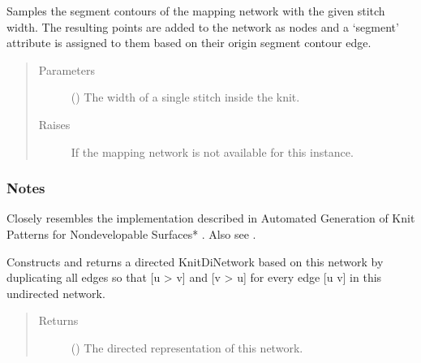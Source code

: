 \documentclass[letterpaper,10pt,english]{sphinxmanual}
\begin{document}
\begin{fulllineitems}
\begin{fulllineitems}
\label{\detokenize{cockatoo:cockatoo.KnitNetwork.sample_segment_contours}}
Samples the segment contours of the mapping network with the given
stitch width. The resulting points are added to the network as nodes
and a ‘segment’ attribute is assigned to them based on their origin
segment contour edge.
\begin{quote}\begin{description}
\item[{Parameters}] \leavevmode
{} () \textendash{} The width of a single stitch inside the knit.

\item[{Raises}] \leavevmode
{\hyperref[\detokenize{cockatoo:cockatoo.exception.MappingNetworkError}]{}} \textendash{} If the mapping network is not available for this instance.

\end{description}\end{quote}
\subsubsection*{Notes}

Closely resembles the implementation described in Automated Generation
of Knit Patterns for Non\sphinxhyphen{}developable Surfaces* \sphinxfootnotemark[1]. Also see  \sphinxfootnotemark[2].

\end{fulllineitems}


\begin{fulllineitems}
\label{\detokenize{cockatoo:cockatoo.KnitNetwork.to_KnitDiNetwork}}
Constructs and returns a directed KnitDiNetwork based on this network
by duplicating all edges so that {[}u \sphinxhyphen{}\textgreater{} v{]} and {[}v \sphinxhyphen{}\textgreater{} u{]} for every
edge {[}u \sphinxhyphen{} v{]} in this undirected network.
\begin{quote}\begin{description}
\item[{Returns}] \leavevmode
{} ({\hyperref[\detokenize{cockatoo:cockatoo.KnitDiNetwork}]{}}) \textendash{} The directed representation of this network.


\end{description}
\end{quote}
\end{fulllineitems}
\end{fulllineitems}
\end{document}
